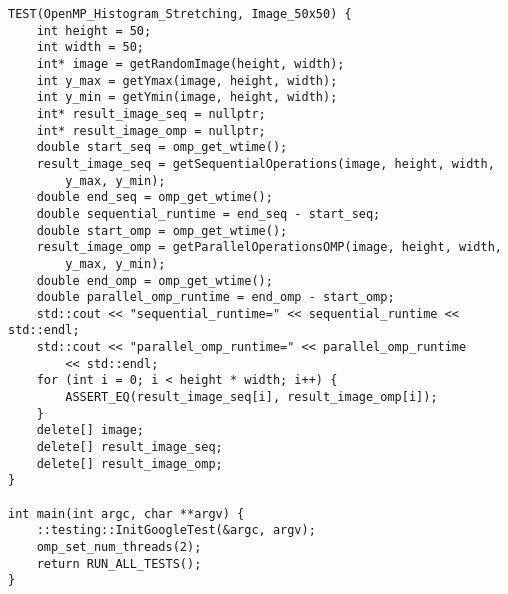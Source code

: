 \documentclass{report}
\begin{document}
\begin{lstlisting}
TEST(OpenMP_Histogram_Stretching, Image_50x50) {
    int height = 50;
    int width = 50;
    int* image = getRandomImage(height, width);
    int y_max = getYmax(image, height, width);
    int y_min = getYmin(image, height, width);
    int* result_image_seq = nullptr;
    int* result_image_omp = nullptr;
    double start_seq = omp_get_wtime();
    result_image_seq = getSequentialOperations(image, height, width,
        y_max, y_min);
    double end_seq = omp_get_wtime();
    double sequential_runtime = end_seq - start_seq;
    double start_omp = omp_get_wtime();
    result_image_omp = getParallelOperationsOMP(image, height, width,
        y_max, y_min);
    double end_omp = omp_get_wtime();
    double parallel_omp_runtime = end_omp - start_omp;
    std::cout << "sequential_runtime=" << sequential_runtime << std::endl;
    std::cout << "parallel_omp_runtime=" << parallel_omp_runtime
        << std::endl;
    for (int i = 0; i < height * width; i++) {
        ASSERT_EQ(result_image_seq[i], result_image_omp[i]);
    }
    delete[] image;
    delete[] result_image_seq;
    delete[] result_image_omp;
}

int main(int argc, char **argv) {
    ::testing::InitGoogleTest(&argc, argv);
    omp_set_num_threads(2);
    return RUN_ALL_TESTS();
}

\end{lstlisting}
\end{document}

